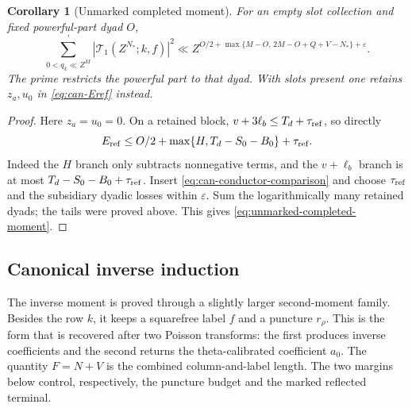 \documentclass[11pt,a4paper]{article}
\numberwithin{equation}{section}
\newtheorem{corollary}[theorem]{Corollary}
\theoremstyle{definition}
\theoremstyle{remark}
\newcommand{\eps}{\varepsilon}
\begin{document}
\begin{corollary}[Unmarked completed moment]\label{cor:unmarked-completed-moment}
For an empty slot collection and fixed powerful-part dyad $O$,
\begin{equation}\label{eq:unmarked-completed-moment}
 \sum_{0<q_k\ll Z^M}^{\prime}
        |\mathcal T_1(Z^{N_*};k,f)|^2
 \ll Z^{O/2+\max\{M-O,\,2M-O+Q+V-N_*\}+\eps}.
\end{equation}
The prime restricts the powerful part to that dyad.  With slots present
one retains $z_a,u_0$ in \eqref{eq:can-Eref} instead.
\end{corollary}
\begin{proof}
Here $z_a=u_0=0$.  On a retained block,
$v+3\ell_b\le T_d+\tau_{\rm ref}$, so directly
\[
 E_{\rm ref}\le O/2+\max\{H,T_d-S_0-B_0\}+\tau_{\rm ref}.
\]
Indeed the $H$ branch only subtracts nonnegative terms, and the
$v+\ell_b$ branch is at most $T_d-S_0-B_0+\tau_{\rm ref}$.
Insert \eqref{eq:can-conductor-comparison} and choose
$\tau_{\rm ref}$ and the subsidiary dyadic losses within $\eps$.
Sum the logarithmically many retained dyads; the tails were proved
above.  This gives \eqref{eq:unmarked-completed-moment}.
\end{proof}

\subsection{Canonical inverse induction}\label{subsec:inverse-induction}

The inverse moment is proved through a slightly larger second-moment
family. Besides the row $k$, it keeps a squarefree label $f$ and a
puncture $r_\rho$. This is the form that is recovered after two Poisson
transforms: the first produces inverse coefficients and the second
returns the theta-calibrated coefficient $a_0$. The quantity $F=N+V$
is the combined column-and-label length. The two margins below control,
respectively, the puncture budget and the marked reflected terminal.
\end{document}
